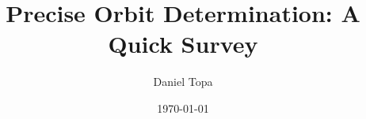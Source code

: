 \documentclass[10pt, oneside]{article}   	%
\title{Precise Orbit Determination: A Quick Survey}
\author{Daniel Topa\\\TopaHIIEmail}
\affil{\missiontech}
\date{\today}
\begin{document}
\maketitle

	

\tableofcontents
	\cite{huang2017real}

	

\newpage
\printbibliography
\end{document}
